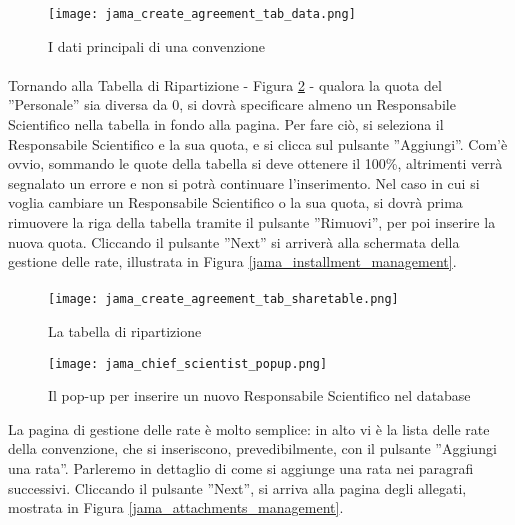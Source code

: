 \begin{figure}[h]
	\centering
	\texttt{[image: jama\_create\_agreement\_tab\_data.png]}
	\caption{I dati principali di una convenzione}
	\label{jama_create_agreement_tab_data}
\end{figure}

\paragraph{}
Tornando alla Tabella di Ripartizione - Figura \ref{jama_create_agreement_tab_sharetable} - qualora la quota del ''Personale'' sia diversa da 0, si dovrà specificare almeno un Responsabile Scientifico nella tabella in fondo alla pagina. Per fare ciò, si seleziona il Responsabile Scientifico e la sua quota, e si clicca sul pulsante ''Aggiungi''. Com'è ovvio, sommando le quote della tabella si deve ottenere il 100\%, altrimenti verrà segnalato un errore e non si potrà continuare l'inserimento.\newline
Nel caso in cui si voglia cambiare un Responsabile Scientifico o la sua quota, si dovrà prima rimuovere la riga della tabella tramite il pulsante ''Rimuovi'', per poi inserire la nuova quota.\newline
Cliccando il pulsante ''Next'' si arriverà alla schermata della gestione delle rate, illustrata in Figura \ref{jama_installment_management}.
\paragraph{}
\begin{figure}
	\centering
	\texttt{[image: jama\_create\_agreement\_tab\_sharetable.png]}
	\caption{La tabella di ripartizione}
	\label{jama_create_agreement_tab_sharetable}
\end{figure}

\begin{figure}
	\centering
	\texttt{[image: jama\_chief\_scientist\_popup.png]}
	\caption{Il pop-up per inserire un nuovo Responsabile Scientifico nel database}
	\label{jama_chief_scientist_popup}
\end{figure}
La pagina di gestione delle rate è molto semplice: in alto vi è la lista delle rate della convenzione, che si inseriscono, prevedibilmente, con il pulsante ''Aggiungi una rata''. Parleremo in dettaglio di come si aggiunge una rata nei paragrafi successivi.\newline
Cliccando il pulsante ''Next'', si arriva alla pagina degli allegati, mostrata in Figura \ref{jama_attachments_management}.
